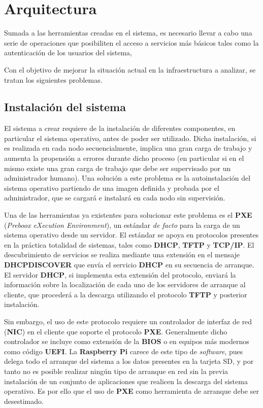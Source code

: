 \chapter{Arquitectura}

Sumada a las herramientas creadas en el sistema, es necesario llevar a cabo una serie de operaciones que posibiliten el acceso a servicios más básicos tales como la autenticación de los usuarios del sistema, %

Con el objetivo de mejorar la situación actual en la infraestructura a analizar, se tratan los siguientes problemas.

\section{Instalación del sistema}

El sistema a crear requiere de la instalación de diferentes componentes, en particular el sistema operativo, antes de poder ser utilizado. Dicha instalación, si es realizada en cada nodo secuencialmente, implica una gran carga de trabajo y aumenta la propensión a errores durante dicho proceso (en particular si en el mismo existe una gran carga de trabajo que debe ser supervisado por un administrador humano). Una solución a este problema es la autoinstalación del sistema operativo partiendo de una imagen definida y probada por el administrador, que se cargará e instalará en cada nodo sin supervisión.

Una de las herramientas ya existentes para solucionar este problema es el \textbf{PXE} (\textit{Preboox eXecution Environment})\cite{pxeintel}, un estándar \textit{de facto}\cite{avramov:architecture} para la carga de un sistema operativo desde un servidor. El estándar se apoya en protocolos presentes en la práctica totalidad de sistemas, tales como \textbf{DHCP}, \textbf{TFTP} y \textbf{TCP/IP}. El descubrimiento de servicios se realiza mediante una extensión en el mensaje \textbf{DHCPDISCOVER} que envía el servicio \textbf{DHCP} en su secuencia de arranque\cite{rfc4578}. El servidor \textbf{DHCP}, si implementa esta extensión del protocolo, enviará la información sobre la localización de cada uno de los servidores de arranque al cliente, que procederá a la descarga utilizando el protocolo \textbf{TFTP} y posterior instalación\cite{pxeoverview}.

Sin embargo, el uso de este protocolo requiere un controlador de interfaz de red (\textbf{NIC}) en el cliente que soporte el protocolo \textbf{PXE}. Generalmente dicho controlador se incluye como extensión de la \textbf{BIOS} o en equipos más modernos como código \textbf{UEFI}. La \textbf{Raspberry Pi} carece de este tipo de \textit{software}, pues delega todo el arranque del sistema a los datos presentes en la tarjeta SD, y por tanto no es posible realizar ningún tipo de arranque en red sin la previa instalación de un conjunto de aplicaciones que realicen la descarga del sistema operativo. Es por ello que el uso de \textbf{PXE} como herramienta de arranque debe ser desestimado.

